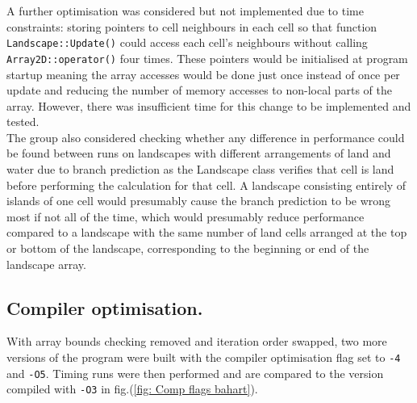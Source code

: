 A further optimisation was considered but not implemented due to time constraints: storing pointers to cell neighbours in each cell so that function \texttt{Landscape::Update()} could access each cell's neighbours without calling \texttt{Array2D::operator()} four times.
These pointers would be initialised at program startup meaning the array accesses would be done just once instead of once per update and reducing the number of memory accesses to non-local parts of the array.
However, there was insufficient time for this change to be implemented and tested.\\

The group also considered checking whether any difference in performance could be found between runs on landscapes with different arrangements of land and water due to branch prediction as the Landscape class verifies that cell is land before performing the calculation for that cell.
A landscape consisting entirely of islands of one cell would presumably cause the branch prediction to be wrong most if not all of the time, which would presumably reduce performance compared to a landscape with the same number of land cells arranged at the top or bottom of the landscape, corresponding to the beginning or end of the landscape array.


\subsection{Compiler optimisation.}
\label{Compiler optimisation}

With array bounds checking removed and iteration order swapped, two more versions of the program were built with the compiler optimisation flag set to \texttt{-4} and \texttt{-O5}.
Timing runs were then performed and are compared to the version compiled with \texttt{-O3} in fig.(\ref{fig: Comp flags bahart}).

